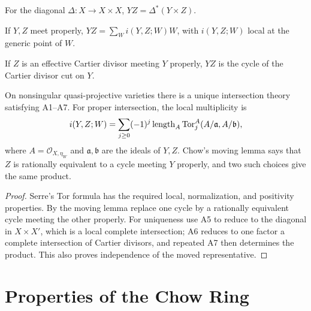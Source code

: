 \begin{convention}
\label{ha-appA-A5}
For the diagonal $\Delta:X\to X\times X$, $YZ=\Delta^*(Y\times Z)$.
\end{convention}

\begin{convention}
\label{ha-appA-A6}
If $Y,Z$ meet properly, $YZ=\sum_W i(Y,Z;W)W$, with $i(Y,Z;W)$ local at the
generic point of $W$.
\end{convention}

\begin{convention}
\label{ha-appA-A7}
If $Z$ is an effective Cartier divisor meeting $Y$ properly, $YZ$ is the cycle
of the Cartier divisor cut on $Y$.
\end{convention}

\begin{theorem}
\label{ha-appA-thm1-1}
On nonsingular quasi-projective varieties there is a unique intersection
theory satisfying A1--A7.  For proper intersection, the local multiplicity is
\[
i(Y,Z;W)=\sum_{j\ge0}(-1)^j\operatorname{length}_A\operatorname{Tor}^A_j(A/\mathfrak a,A/\mathfrak b),
\]
where $A=\mathcal O_{X,\eta_W}$ and $\mathfrak a,\mathfrak b$ are the ideals
of $Y,Z$.  Chow's moving lemma says that $Z$ is rationally equivalent to a
cycle meeting $Y$ properly, and two such choices give the same product.
\end{theorem}

\begin{proof}
Serre's Tor formula has the required local, normalization, and positivity
properties.  By the moving lemma replace one cycle by a rationally equivalent
cycle meeting the other properly.  For uniqueness use A5 to reduce to the
diagonal in $X\times X'$, which is a local complete intersection; A6 reduces
to one factor a complete intersection of Cartier divisors, and repeated A7
then determines the product.  This also proves independence of the moved
representative.
\end{proof}



\section{Properties of the Chow Ring}
\label{ha-appA-sec2}


